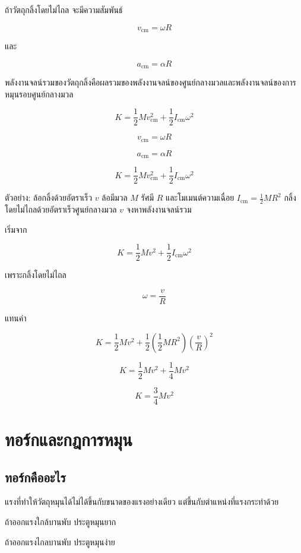 ถ้าวัตถุกลิ้งโดยไม่ไถล จะมีความสัมพันธ์

\[
v_{\text{cm}}=\omega R
\]

และ

\[
a_{\text{cm}}=\alpha R
\]

พลังงานจลน์รวมของวัตถุกลิ้งคือผลรวมของพลังงานจลน์ของศูนย์กลางมวลและพลังงานจลน์ของการหมุนรอบศูนย์กลางมวล

\[
K=\frac{1}{2}Mv_{\text{cm}}^2+\frac{1}{2}I_{\text{cm}}\omega^2
\]

\begin{tcolorbox}[title=การกลิ้งโดยไม่ไถล]
\[
v_{\text{cm}}=\omega R
\]

\[
a_{\text{cm}}=\alpha R
\]

\[
K=\frac{1}{2}Mv_{\text{cm}}^2+\frac{1}{2}I_{\text{cm}}\omega^2
\]
\end{tcolorbox}

\begin{examplebox}{ตัวอย่าง: ล้อกลิ้งด้วยอัตราเร็ว $v$}
ล้อมีมวล $M$ รัศมี $R$ และโมเมนต์ความเฉื่อย $I_{\text{cm}}=\frac{1}{2}MR^2$ กลิ้งโดยไม่ไถลด้วยอัตราเร็วศูนย์กลางมวล $v$ จงหาพลังงานจลน์รวม

เริ่มจาก

\[
K=\frac{1}{2}Mv^2+\frac{1}{2}I_{\text{cm}}\omega^2
\]

เพราะกลิ้งโดยไม่ไถล

\[
\omega=\frac{v}{R}
\]

แทนค่า

\[
K=\frac{1}{2}Mv^2+\frac{1}{2}\left(\frac{1}{2}MR^2\right)\left(\frac{v}{R}\right)^2
\]

\[
K=\frac{1}{2}Mv^2+\frac{1}{4}Mv^2
\]

\[
\boxed{K=\frac{3}{4}Mv^2}
\]
\end{examplebox}

\section{ทอร์กและกฎการหมุน}

\subsection{ทอร์กคืออะไร}

แรงที่ทำให้วัตถุหมุนได้ไม่ได้ขึ้นกับขนาดของแรงอย่างเดียว แต่ขึ้นกับตำแหน่งที่แรงกระทำด้วย

ถ้าออกแรงใกล้บานพับ ประตูหมุนยาก

ถ้าออกแรงไกลบานพับ ประตูหมุนง่าย

